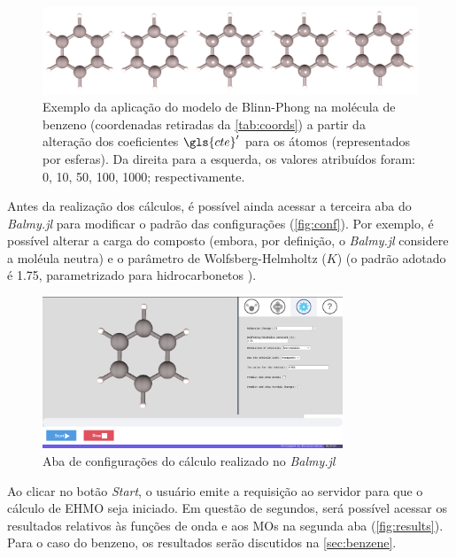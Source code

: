 
\begin{figure}[htb]
\caption{\label{fig:representations} Exemplo da aplicação do modelo de Blinn-Phong na molécula de benzeno (coordenadas retiradas da \autoref{tab:coords}) a partir da alteração dos coeficientes $\gls{cte}'$ para os átomos (representados por esferas). Da direita para a esquerda, os valores atribuídos foram: 0, 10, 50, 100, 1000; respectivamente.}
	\begin{center}
		\includegraphics[width=1.0\textwidth]{images/shininess(1).png}
	\end{center}
\end{figure}

Antes da realização dos cálculos, é possível ainda acessar a terceira aba do \textit{Balmy.jl} para modificar o padrão das configurações (\autoref{fig:conf}). Por exemplo, é possível alterar a carga do composto (embora, por definição, o \textit{Balmy.jl} considere a moléula neutra) e o parâmetro de Wolfsberg-Helmholtz ($K$) (o padrão adotado é 1.75, parametrizado para hidrocarbonetos \autocite{Hoffmann1963}).

\begin{figure}[htb]
	\caption{\label{fig:conf} Aba de configurações do cálculo realizado no \textit{Balmy.jl}}
	\begin{center}
		\includegraphics[width=0.8\textwidth]{images/conf.png}
	\end{center}
\end{figure}


Ao clicar no botão \textit{Start}, o usuário emite a requisição ao servidor para que o cálculo de \gls{EHMO} seja iniciado. Em questão de segundos, será possível acessar os resultados relativos às funções de onda e aos \gls{MOs} na segunda aba (\autoref{fig:results}). Para o caso do benzeno, os resultados serão discutidos na \autoref{sec:benzene}.


